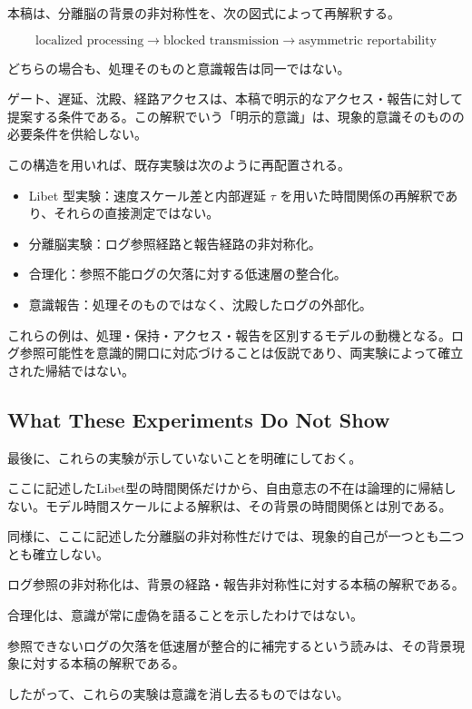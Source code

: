本稿は、分離脳の背景の非対称性を、次の図式によって再解釈する。

\begin{equation}
\text{localized processing}
\rightarrow
\text{blocked transmission}
\rightarrow
\text{asymmetric reportability}
\end{equation}

どちらの場合も、処理そのものと意識報告は同一ではない。

ゲート、遅延、沈殿、経路アクセスは、本稿で明示的なアクセス・報告に対して提案する条件である。この解釈でいう「明示的意識」は、現象的意識そのものの必要条件を供給しない。

この構造を用いれば、既存実験は次のように再配置される。

\begin{itemize}
\item Libet 型実験：速度スケール差と内部遅延 $\tau$ を用いた時間関係の再解釈であり、それらの直接測定ではない。
\item 分離脳実験：ログ参照経路と報告経路の非対称化。
\item 合理化：参照不能ログの欠落に対する低速層の整合化。
\item 意識報告：処理そのものではなく、沈殿したログの外部化。
\end{itemize}

これらの例は、処理・保持・アクセス・報告を区別するモデルの動機となる。ログ参照可能性を意識的開口に対応づけることは仮説であり、両実験によって確立された帰結ではない。

\subsection{What These Experiments Do Not Show}

最後に、これらの実験が示していないことを明確にしておく。

ここに記述したLibet型の時間関係だけから、自由意志の不在は論理的に帰結しない。モデル時間スケールによる解釈は、その背景の時間関係とは別である。

同様に、ここに記述した分離脳の非対称性だけでは、現象的自己が一つとも二つとも確立しない。

ログ参照の非対称化は、背景の経路・報告非対称性に対する本稿の解釈である。

合理化は、意識が常に虚偽を語ることを示したわけではない。

参照できないログの欠落を低速層が整合的に補完するという読みは、その背景現象に対する本稿の解釈である。

したがって、これらの実験は意識を消し去るものではない。

